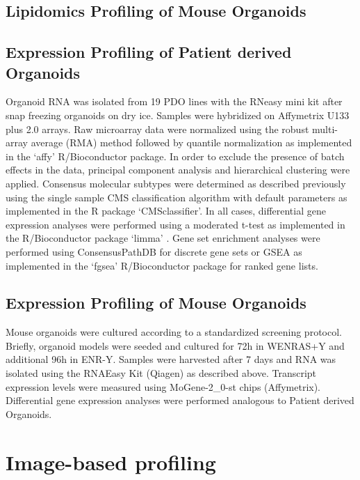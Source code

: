 \begin{flushleft}
\subsection{Lipidomics Profiling of Mouse Organoids}

\subsection{Expression Profiling of Patient derived Organoids}
Organoid RNA was isolated from 19 PDO lines with the RNeasy mini kit after snap freezing organoids on dry ice. Samples were hybridized on Affymetrix U133 plus 2.0 arrays. Raw microarray data were normalized using the robust multi-array average (RMA) method \cite{Irizarry2003-vi} followed by quantile normalization as implemented in the ‘affy’ \cite{Gautier2004-jj} R/Bioconductor \cite{Huber2015-kc} package. In order to exclude the presence of batch effects in the data, principal component analysis and hierarchical clustering were applied. Consensus molecular subtypes were determined as described previously using the single sample CMS classification algorithm with default parameters as implemented in the R package ‘CMSclassifier’. In all cases, differential gene expression analyses were performed using a moderated t-test as implemented in the R/Bioconductor package ‘limma’ \cite{Ritchie2015-vf}. Gene set enrichment analyses were performed using ConsensusPathDB \cite{Kamburov2013-co} for discrete gene sets or GSEA as implemented in the ‘fgsea’ \cite{Korotkevich2021-xu} R/Bioconductor package for ranked gene lists.

\subsection{Expression Profiling of Mouse Organoids}
Mouse organoids were cultured according to a standardized screening protocol. Briefly, organoid models were seeded and cultured for 72h in WENRAS+Y and additional 96h in ENR-Y. Samples were harvested after 7 days and RNA was isolated using the RNAEasy Kit (Qiagen) as described above. Transcript expression levels were measured using MoGene-2\_0-st chips (Affymetrix).
Differential gene expression analyses were performed analogous to Patient derived Organoids.

\section{Image-based profiling}


\end{flushleft}
